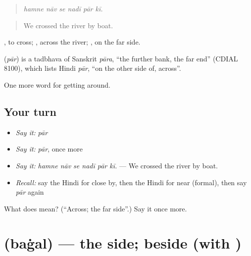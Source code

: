 \begin{quote}
     
\end{quote}

\begin{quote}
\emph{hamne nāv se nadī pār kī.}
\end{quote}

\begin{quote}
We crossed the river by boat.
\end{quote}

 , to cross;   , across the river;  , on the far side.

\begin{cousinweb}
\textbf{} (\emph{pār}) is a tadbhava of Sanskrit \emph{pāra}, \textquotedblleft{}the further bank, the far end\textquotedblright{} (CDIAL 8100), which lists Hindi \emph{pār}, \textquotedblleft{}on the other side of, across\textquotedblright{}.
\end{cousinweb}

\begin{grammarlens}[title={What you've built}]
One more word for getting around.
\end{grammarlens}

\subsection*{Your turn}
\begin{itemize}
\raggedright
  \item \emph{Say it:} \emph{pār}
  \item \emph{Say it:} \emph{pār}, once more
  \item \emph{Say it:} \emph{hamne nāv se nadī pār kī.} — We crossed the river by boat.
  \item \emph{Recall:} say the Hindi for close by, then the Hindi for near (formal), then say \emph{pār} again
\end{itemize}

\begin{tcolorbox}[breakable,colback=teal!4,colframe=teal!35!black,title={Before you move on}]
What does  mean? (\textquotedblleft{}Across; the far side\textquotedblright{}.) Say it once more.
\end{tcolorbox}
\section[\texorpdfstring{\hi{बग़ल} (baġal)}{बग़ल (baġal)}]{ (baġal) — the side; beside (with )}

